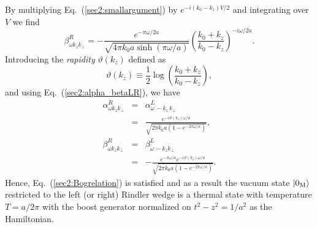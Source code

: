 \documentclass[12pt,nofootinbib,floatfix,aps,prd,showpacs,amsmath,amssymb,eqsecnum]{revtex4-2}
\begin{document}
By multiplying Eq.~(\ref{sec2:smallargument}) by $e^{-i(k_0-k_z)V/2}$
and integrating over $V$ we find
\begin{equation}
\beta_{\omega k_z k_\perp}^R =  - \frac{e^{-\pi\omega/2a}}
{\sqrt{4\pi k_0 a \sinh(\pi\omega/a)}}
\left(\frac{k_0+k_z}{k_0-k_z}\right)^{-i\omega/2a}.
\end{equation}
Introducing the {\em rapidity} $\vartheta(k_z)$ defined as
\begin{equation}
\vartheta(k_z) \equiv  \frac{1}{2}\log \left(
\frac{k_0+k_z}{k_0-k_z}\right), \label{sec2:rapidity}
\end{equation}
and using Eq.~(\ref{sec2:alpha_betaLR}), we
have
\begin{eqnarray}
\alpha^R_{\omega k_z k_\perp} & = &
\alpha^L_{\omega\, -k_z\, k_\perp}\nonumber \\
& = & \frac{e^{-i\vartheta(k_z)\omega/a}}{\sqrt{2\pi k_0 a
(1-e^{-2\pi\omega/a})}},\\
\beta^R_{\omega k_z k_\perp} & = &
\beta^L_{\omega\,-k_z k_\perp}\nonumber \\
& = & 
- \frac{e^{-\pi\omega/a}e^{-i\vartheta(k_z)\omega/a}}{\sqrt{2\pi k_0 a
(1-e^{-2\pi\omega/a})}}.
\end{eqnarray}
Hence, Eq.~(\ref{sec2:Bogrelation}) is
satisfied and as a result the vacuum state $|0_{\rm M}\rangle$
restricted to the left (or right) Rindler wedge is a thermal state with
temperature $T= a/2\pi$ with the boost generator normalized on
$t^2-z^2=1/a^2$ as the Hamiltonian.
\end{document}
